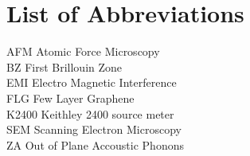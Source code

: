 \chapter*{List of Abbreviations}

\noindent

AFM \hfill Atomic Force Microscopy \\

BZ \hfill First Brillouin Zone \\

EMI \hfill Electro Magnetic Interference \\

FLG \hfill Few Layer Graphene \\

K2400 \hfill Keithley 2400 source meter \\

SEM \hfill Scanning Electron Microscopy \\

ZA \hfill Out of Plane Accoustic Phonons

\newpage